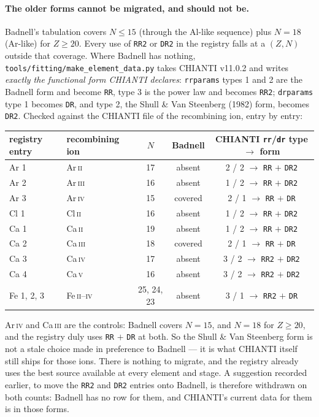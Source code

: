 \documentclass[english,a4paper]{my_memo}
\newcommand{\code}[1]{\texttt{#1}}
\begin{document}
\paragraph{The older forms cannot be migrated, and should not be.}  Badnell's
tabulation covers $N \le 15$ (through the Al-like sequence) plus $N = 18$
(Ar-like) for $Z \ge 20$.  Every use of \code{RR2} or \code{DR2} in the
registry falls at a $(Z, N)$ outside that coverage.  Where Badnell has nothing,
\code{tools/fitting/make\_element\_data.py} takes CHIANTI v11.0.2 and writes
\emph{exactly the functional form CHIANTI declares}: \code{rrparams} types 1
and 2 are the Badnell form and become \code{RR}, type 3 is the power law and
becomes \code{RR2}; \code{drparams} type 1 becomes \code{DR}, and type 2, the
Shull \& Van Steenberg (1982) form, becomes \code{DR2}.  Checked against the
CHIANTI file of the recombining ion, entry by entry:
\begin{center}\small
\begin{tabular}{@{}llccc@{}}
\toprule
registry entry & recombining ion & $N$ & Badnell & CHIANTI
  \code{rr}/\code{dr} type $\to$ form \\
\midrule
Ar 1        & Ar\,\textsc{ii}    & 17 & absent  & 2 / 2 $\to$ \code{RR} $+$ \code{DR2} \\
Ar 2        & Ar\,\textsc{iii}   & 16 & absent  & 1 / 2 $\to$ \code{RR} $+$ \code{DR2} \\
Ar 3        & Ar\,\textsc{iv}    & 15 & covered & 2 / 1 $\to$ \code{RR} $+$ \code{DR}  \\
Cl 1        & Cl\,\textsc{ii}    & 16 & absent  & 1 / 2 $\to$ \code{RR} $+$ \code{DR2} \\
Ca 1        & Ca\,\textsc{ii}    & 19 & absent  & 1 / 2 $\to$ \code{RR} $+$ \code{DR2} \\
Ca 2        & Ca\,\textsc{iii}   & 18 & covered & 2 / 1 $\to$ \code{RR} $+$ \code{DR}  \\
Ca 3        & Ca\,\textsc{iv}    & 17 & absent  & 3 / 2 $\to$ \code{RR2} $+$ \code{DR2} \\
Ca 4        & Ca\,\textsc{v}     & 16 & absent  & 3 / 2 $\to$ \code{RR2} $+$ \code{DR2} \\
Fe 1, 2, 3  & Fe\,\textsc{ii}--\textsc{iv} & 25, 24, 23 & absent
  & 3 / 1 $\to$ \code{RR2} $+$ \code{DR} \\
\bottomrule
\end{tabular}
\end{center}
Ar\,\textsc{iv} and Ca\,\textsc{iii} are the controls: Badnell covers $N = 15$,
and $N = 18$ for $Z \ge 20$, and the registry duly uses \code{RR} $+$
\code{DR} at both.  So the Shull \& Van Steenberg form is not a stale choice
made in preference to Badnell --- it is what CHIANTI itself still ships for
those ions.  There is nothing to migrate, and the registry already uses the
best source available at every element and stage.  A suggestion recorded
earlier, to move the \code{RR2} and \code{DR2} entries onto Badnell, is
therefore withdrawn on both counts: Badnell has no row for them, and CHIANTI's
current data for them is in those forms.
\end{document}

